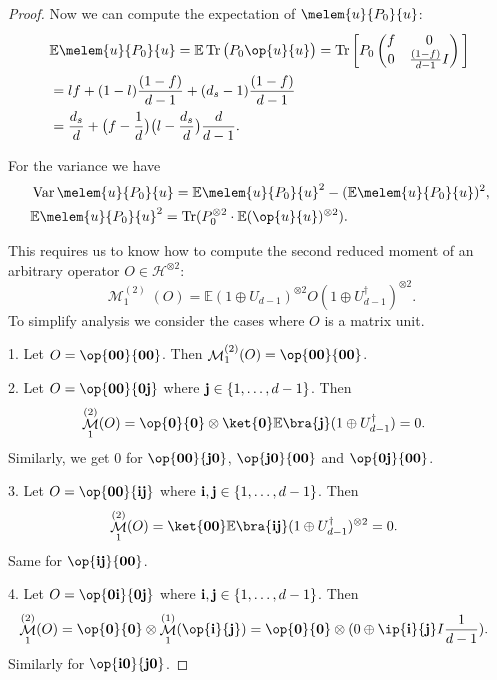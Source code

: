 \documentclass[pra,twocolumn,superscriptaddress,longbibliography]{revtex4-2}
\theoremstyle{remark}
\newcommand{\mcl}{\mathcal}
\newcommand{\mbb}{\mathbb}
\newcommand{\bmp}{\begin{pmatrix}}
\newcommand{\emp}{\end{pmatrix}}
\DeclareMathOperator{\tr}{Tr}
\DeclareMathOperator{\var}{\mathrm{Var}}
\DeclareMathOperator{\mom}{\mcl{M}}
\numberwithin{equation}{section}
\begin{document}
\begin{proof}
Now we can compute the expectation of $\melem{u}{P_0}{u}$: 
\begin{align*}
& {\mbb{E}}\melem{u}{P_0}{u} 
= {\mbb{E}}\tr\big(P_0 \op{u}{u} \big)
= \tr\bigg[P_0 \bmp f & 0 \\ 0 & \frac{(1-f)}{d-1}I \emp \bigg] \\
& = lf + (1-l)\frac{(1-f)}{d-1} + (d_s-1)\frac{(1-f)}{d-1} \\
& = \frac{d_s}{d} + \big(f - \frac{1}{d}\big)\big(l - \frac{d_s}{d}\big)\frac{d}{d-1}.
\end{align*}

For the variance we have 
\begin{align*}
& \var\melem{u}{P_0}{u} = \mbb{E}\melem{u}{P_0}{u}^2 - (\mbb{E}\melem{u}{P_0}{u})^2, \\
& \mbb{E}\melem{u}{P_0}{u}^2 
= \tr(P_0^{\otimes2} \cdot \mbb{E}(\op{u}{u})^{\otimes2}).
\end{align*}

This requires us to know how to compute the second reduced moment of an arbitrary operator $O \in \mcl{H}^{\otimes2}$: 
$$
\mom_1^{(2)}(O) = \mbb{E}(1 \oplus U_{d-1})^{\otimes2} O (1 \oplus U_{d-1}^\dagger)^{\otimes2}.
$$  
To simplify analysis we consider the cases where $O$ is a matrix unit. 

1. Let $O = \op{\bf 00}{\bf 00}$. 
Then $\mom_1^{(2)}(O) = \op{\bf 00}{\bf 00}$. 

2. Let $O = \op{\bf 00}{\bf 0j}$ where ${\bf j} \in \{1,\dots,d-1\}$. 
Then
\begin{align*}
& \mom_1^{(2)}(O) = \op{\bf 0}{\bf 0} \otimes \ket{\bf 0}\mbb{E}\bra{\bf j} (1\oplus U_{d-1}^\dagger) = 0. 
\end{align*}
Similarly, we get $0$ for $\op{\bf 00}{\bf j0}$, $\op{\bf j0}{\bf 00}$ and $\op{\bf 0j}{\bf 00}$.

3. Let $O = \op{\bf 00}{\bf ij}$ where ${\bf i,j} \in \{1,\dots,d-1\}$. 
Then 
\begin{align*}
& \mom_1^{(2)}(O) = \ket{\bf 00}\mbb{E}\bra{\bf ij} (1 \oplus U_{d-1}^\dagger)^{\otimes2} = 0. 
\end{align*}
Same for $\op{\bf ij}{\bf 00}$.

4. Let $O = \op{\bf 0i}{\bf 0j}$ where ${\bf i,j} \in \{1,\dots,d-1\}$. 
Then 
\begin{align*}
& \mom_1^{(2)}(O) = \op{\bf 0}{\bf 0} \otimes \mom_1^{(1)}(\op{\bf i}{\bf j}) 
= \op{\bf 0}{\bf 0} \otimes (0\oplus\ip{\bf i}{\bf j}I\frac{1}{d-1}). 
\end{align*}
Similarly for $\op{\bf i0}{\bf j0}$.


\end{proof}
\end{document}
